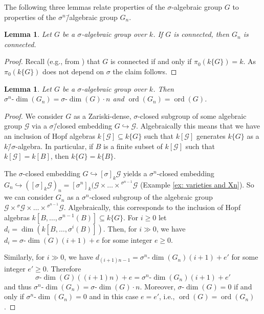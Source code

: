 \documentclass[oneside,reqno]{amsart}
\newtheorem{lemma}[theo]{Lemma}
\theoremstyle{definition}
\newcommand{\G}{\mathcal{G}}
\newcommand{\sdim}{\sigma\text{-}\dim}
\newcommand{\ord}{\operatorname{ord}}
\newcommand{\s}{\sigma}
\newcommand{\hs}{{{}^\sigma\!}}
\newcommand{\ks}{$k$\=/$\s$}
\begin{document}
 
The following three lemmas relate properties of the $\s$-algebraic group $G$ to properties of the $\s^n$\=/algebraic group $G_n$.
 
 
 \begin{lemma} \label{lem: connectedness preserved}
 	Let $G$ be a $\s$-algebraic group over $k$. If $G$ is connected, then $G_n$ is connected.	
 \end{lemma}
 \begin{proof}
 	Recall (e.g., from \cite[Lemma 6.7]{Wibmer:almostsimple}) that $G$ is connected if and only if $\pi_0(k\{G\})=k$. As $\pi_0(k\{G\})$ does not depend on $\s$ the claim follows.
 \end{proof}
 
 \begin{lemma} \label{lem: sdim and order preserved}
 	Let $G$ be a $\s$-algebraic group over $k$. Then $\s^n\text{-}\dim(G_n)=\sdim(G)\cdot n$ and $\ord(G_n)=\ord(G)$. 
 \end{lemma}
 \begin{proof}
 	We consider $G$ as a Zariski-dense, $\s$-closed subgroup of some algebraic group $\G$ via a $\s$\=/closed embedding $G \hookrightarrow\G$.  
    Algebraically this means that we have an inclusion of Hopf algebras $k[\G]\subseteq k\{G\}$ such that $k[\G]$ generates $k\{G\}$ as a \ks-algebra. In particular, if $B$ is a finite subset of $k[\G]$ such that $k[\G]=k[B]$, then $k\{G\}=k\{B\}$.
 	
 	The $\s$-closed embedding $G\hookrightarrow[\s]_k\G$ yields a $\s^n$-closed embedding $G_n\hookrightarrow([\s]_k\G)_n=[\s^n]_k(\G\times\ldots\times {^{\s^{n-1}}\!\G}$ (Example \ref{ex: varieties and Xn}). So we can consider $G_n$ as a $\s^n$-closed subgroup of the algebraic group $\G\times {\hs\G}\times\ldots\times{^{\s^{n-1}}\!\G}$. Algebraically, this corresponds to the inclusion of Hopf algebras $k[B,\ldots,\s^{n-1}(B)]\subseteq k\{G\}$.
 	For $i\geq 0$ let $d_i=\dim(k[B,\ldots,\s^{i}(B)])$. Then, for $i\gg 0$, we have $d_i=\sdim(G)(i+1)+e$ for some integer $e\geq 0$.
 	
 	Similarly, for $i\gg 0$, we have $d_{(i+1)n-1}=\s^n\text{-}\dim(G_n)(i+1)+e'$ for some integer $e'\geq 0$. Therefore
 	$$\sdim(G)((i+1)n)+e=\s^n\text{-}\dim(G_n)(i+1)+e'$$
 	and thus $\s^n$-$\dim(G_n)=\sdim(G)\cdot n$. Moreover, $\sdim(G)=0$ if and only if  $\s^n$-$\dim(G_n)=0$ and in this case $e=e'$, i.e., $\ord(G)=\ord(G_n)$.	 
 \end{proof}
\end{document}
